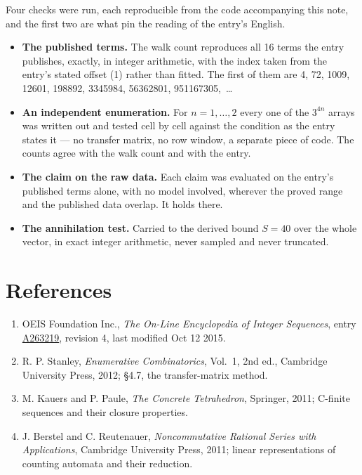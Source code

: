 \documentclass[11pt]{article}
\theoremstyle{definition}
\begin{document}
Four checks were run, each reproducible from the code accompanying this note, and the first two are what pin the reading of the entry's English.

\begin{itemize}

\item {\bfseries The published terms.} The walk count reproduces all 16 terms the entry publishes, exactly, in integer arithmetic, with the index taken from the entry's stated offset (1) rather than fitted. The first of them are 4, 72, 1009, 12601, 198892, 3345984, 56362801, 951167305,~\dots

\item {\bfseries An independent enumeration.} For $n = 1,\dots,2$ every one of the $3^{4n}$ arrays was written out and tested cell by cell against the condition as the entry states it --- no transfer matrix, no row window, a separate piece of code. The counts agree with the walk count and with the entry.

\item {\bfseries The claim on the raw data.} Each claim was evaluated on the entry's published terms alone, with no model involved, wherever the proved range and the published data overlap. It holds there.

\item {\bfseries The annihilation test.} Carried to the derived bound $S = 40$ over the whole vector, in exact integer arithmetic, never sampled and never truncated.

\end{itemize}

\section{References}

\begin{enumerate}

\item OEIS Foundation Inc., \emph{The On-Line Encyclopedia of Integer Sequences}, entry \href{https://oeis.org/A263219}{A263219}, revision 4, last modified Oct 12 2015.

\item R. P. Stanley, \emph{Enumerative Combinatorics}, Vol.~1, 2nd ed., Cambridge University Press, 2012; \S4.7, the transfer-matrix method.

\item M. Kauers and P. Paule, \emph{The Concrete Tetrahedron}, Springer, 2011; C-finite sequences and their closure properties.

\item J. Berstel and C. Reutenauer, \emph{Noncommutative Rational Series with Applications}, Cambridge University Press, 2011; linear representations of counting automata and their reduction.

\end{enumerate}
\end{document}

